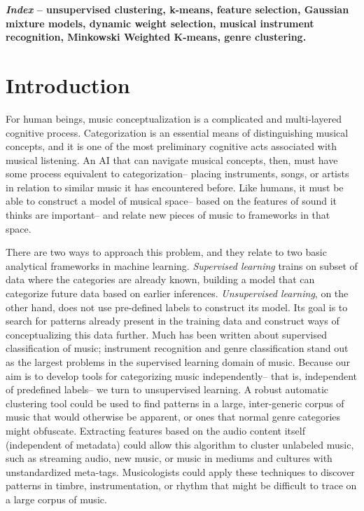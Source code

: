 \documentclass[12pt,twocolumn,titlepage]{article}
\begin{document}
\textbf{\emph{Index} -- unsupervised clustering, k-means, feature selection, Gaussian mixture models, dynamic weight selection, musical instrument recognition, Minkowski Weighted K-means, genre clustering.}



\section{Introduction}

For human beings, music conceptualization is a complicated and multi-layered cognitive process. Categorization is an essential means of distinguishing musical concepts, and it is one of the most preliminary cognitive acts associated with musical listening. \cite{Conceptualizing} An AI that can navigate musical concepts, then, must have some process equivalent to categorization-- placing instruments, songs, or artists in relation to similar music it has encountered before. Like humans, it must be able to construct a model of musical space-- based on the features of sound it thinks are important-- and relate new pieces of music to frameworks in that space. 

There are two ways to approach this problem, and they relate to two basic analytical frameworks in machine learning. \emph{Supervised learning} trains on subset of data where the categories are already known, building a model that can categorize future data based on earlier inferences. \emph{Unsupervised learning}, on the other hand, does not use pre-defined labels to construct its model. Its goal is to search for patterns already present in the training data and construct ways of conceptualizing this data further. Much has been written about supervised classification of music; instrument recognition \cite{Essid} and genre classification \cite{MaggbladeHongKao} \cite{LiChan} stand out as the largest problems in the supervised learning domain of music. Because our aim is to develop tools for categorizing music independently-- that is, independent of predefined labels-- we turn to unsupervised learning. A robust automatic clustering tool could be used to find patterns in a large, inter-generic corpus of music that would otherwise be apparent, or ones that normal genre categories might obfuscate. Extracting features based on the audio content itself (independent of metadata) could allow this algorithm to cluster unlabeled music, such as streaming audio, new music, or music in mediums and cultures with unstandardized meta-tags. Musicologists could apply these techniques to discover patterns in timbre, instrumentation, or rhythm that might be difficult to trace on a large corpus of music.
\end{document}
